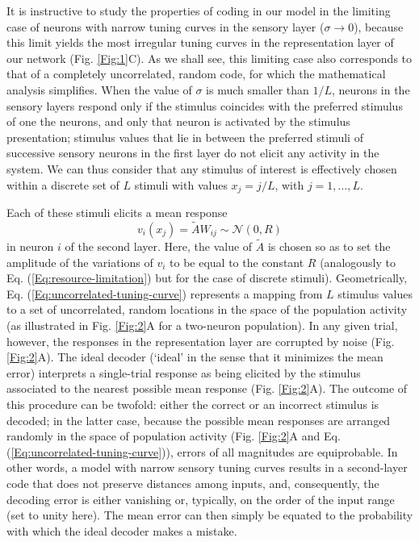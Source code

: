 \documentclass[a4paper]{article}%
\begin{document}
It is instructive to study the properties of coding in our model in the
limiting case of neurons with narrow tuning curves in the sensory layer
($\sigma\rightarrow0$), because this limit yields the most irregular tuning
curves in the representation layer of our network (Fig. \ref{Fig:1}C). As we
shall see, this limiting case also corresponds to that of a completely
uncorrelated, random code, for which the mathematical analysis simplifies.
When the value of $\sigma$ is much smaller than $1/L$, neurons in the sensory
layers respond only if the stimulus coincides with the preferred stimulus of
one the neurons, and only that neuron is activated by the stimulus
presentation; stimulus values that lie in between the preferred stimuli of
successive sensory neurons in the first layer do not elicit any activity in
the system. We can thus consider that any stimulus of interest is effectively
chosen within a discrete set of $L$ stimuli with values $x_{j}=j/L$, with
$j=1,\ldots,L$.

Each of these stimuli elicits a mean response
\begin{equation}
v_{i}(x_{j})=\tilde{A}W_{ij}\sim\mathcal{N}(0,R)
\label{Eq:uncorrelated-tuning-curve}%
\end{equation}
in neuron $i$ of the second layer. Here, the value of $\tilde{A}$ is chosen so
as to set the amplitude of the variations of $v_{i}$ to be equal to the
constant $R$ (analogously to Eq. (\ref{Eq:resource-limitation}) but for the
case of discrete stimuli). Geometrically, Eq.
(\ref{Eq:uncorrelated-tuning-curve}) represents a mapping from $L$ stimulus
values to a set of uncorrelated, random locations in the space of the
population activity (as illustrated in Fig. \ref{Fig:2}A for a two-neuron
population). In any given trial, however, the responses in the representation
layer are corrupted by noise (Fig. \ref{Fig:2}A). The ideal decoder (`ideal'
in the sense that it minimizes the mean error) interprets a single-trial
response as being elicited by the stimulus associated to the nearest possible
mean response (Fig. \ref{Fig:2}A). The outcome of this procedure can be
twofold: either the correct or an incorrect stimulus is decoded; in the latter
case, because the possible mean responses are arranged randomly in the space
of population activity (Fig. \ref{Fig:2}A and Eq.
(\ref{Eq:uncorrelated-tuning-curve})), errors of all magnitudes are
equiprobable. In other words, a model with narrow sensory tuning curves
results in a second-layer code that does not preserve distances among inputs,
and, consequently, the decoding error is either vanishing or, typically, on
the order of the input range (set to unity here). The mean error can then
simply be equated to the probability with which the ideal decoder makes a mistake.
\end{document}
